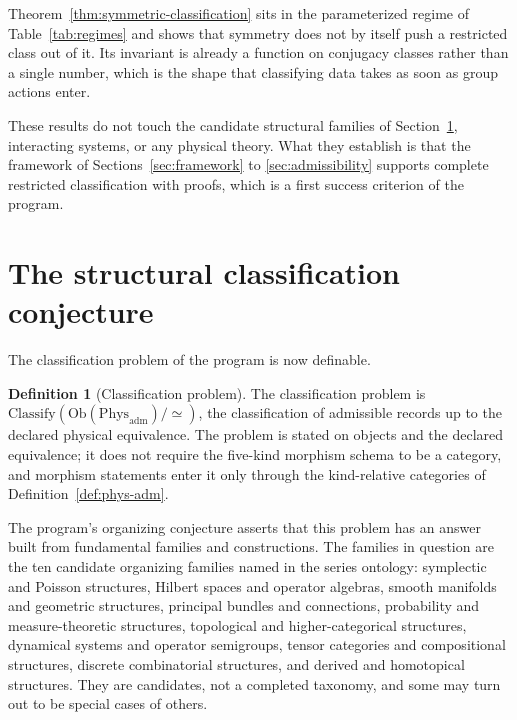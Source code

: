 \documentclass[11pt,letterpaper]{article}
\theoremstyle{definition}
\newtheorem{definition}[theorem]{Definition}
\theoremstyle{remark}
\begin{document}
Theorem~\ref{thm:symmetric-classification} sits in the parameterized regime of Table~\ref{tab:regimes} and shows that symmetry does not by itself push a restricted class out of it. Its invariant is already a function on conjugacy classes rather than a single number, which is the shape that classifying data takes as soon as group actions enter.

These results do not touch the candidate structural families of Section~\ref{sec:conjecture}, interacting systems, or any physical theory. What they establish is that the framework of Sections~\ref{sec:framework} to \ref{sec:admissibility} supports complete restricted classification with proofs, which is a first success criterion of the program.

\section{The structural classification conjecture}
\label{sec:conjecture}

The classification problem of the program is now definable.

\begin{definition}[Classification problem]
\label{def:classification-problem}
The classification problem is $\mathrm{Classify}(\mathrm{Ob}(\mathrm{Phys}_{\mathrm{adm}})/\simeq)$, the classification of admissible records up to the declared physical equivalence. The problem is stated on objects and the declared equivalence; it does not require the five-kind morphism schema to be a category, and morphism statements enter it only through the kind-relative categories of Definition~\ref{def:phys-adm}.
\end{definition}

The program's organizing conjecture asserts that this problem has an answer built from fundamental families and constructions. The families in question are the ten candidate organizing families named in the series ontology: symplectic and Poisson structures, Hilbert spaces and operator algebras, smooth manifolds and geometric structures, principal bundles and connections, probability and measure-theoretic structures, topological and higher-categorical structures, dynamical systems and operator semigroups, tensor categories and compositional structures, discrete combinatorial structures, and derived and homotopical structures. They are candidates, not a completed taxonomy, and some may turn out to be special cases of others.
\end{document}
